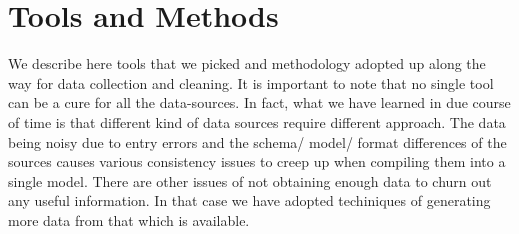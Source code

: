 \section{Tools and Methods}

We describe here tools that we picked and methodology adopted up along the way for data collection and cleaning. It is important to note that no single tool can be a cure for all the data-sources. In fact, what we have learned in due course of time is that different kind of data sources require different approach.
The data being noisy due to entry errors and the schema/ model/ format differences of the sources causes various consistency issues to creep up when compiling them into a single model.
There are other issues of not obtaining enough data to churn out any useful information. In that case we have adopted techiniques of generating more data from that which is available.

